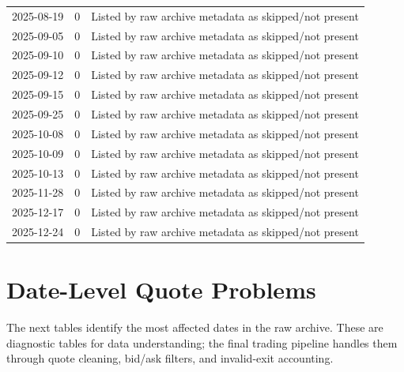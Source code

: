 \documentclass[11pt]{article}
\begin{document}
\begin{longtable}{rll}
2025-08-19 & 0 & Listed by raw archive metadata as skipped/not present \\
2025-09-05 & 0 & Listed by raw archive metadata as skipped/not present \\
2025-09-10 & 0 & Listed by raw archive metadata as skipped/not present \\
2025-09-12 & 0 & Listed by raw archive metadata as skipped/not present \\
2025-09-15 & 0 & Listed by raw archive metadata as skipped/not present \\
2025-09-25 & 0 & Listed by raw archive metadata as skipped/not present \\
2025-10-08 & 0 & Listed by raw archive metadata as skipped/not present \\
2025-10-09 & 0 & Listed by raw archive metadata as skipped/not present \\
2025-10-13 & 0 & Listed by raw archive metadata as skipped/not present \\
2025-11-28 & 0 & Listed by raw archive metadata as skipped/not present \\
2025-12-17 & 0 & Listed by raw archive metadata as skipped/not present \\
2025-12-24 & 0 & Listed by raw archive metadata as skipped/not present \\
\bottomrule
\end{longtable}
\endgroup

\section*{Date-Level Quote Problems}

The next tables identify the most affected dates in the raw archive. These are
diagnostic tables for data understanding; the final trading pipeline handles
them through quote cleaning, bid/ask filters, and invalid-exit accounting.
\end{document}
